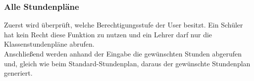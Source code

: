 \subsubsection{Alle Stundenpläne}
Zuerst wird überprüft, welche Berechtigungsstufe der User besitzt. Ein Schüler hat kein Recht diese Funktion zu nutzen und ein Lehrer darf nur die Klassenstundenpläne abrufen.\\
Anschließend werden anhand der Eingabe die gewünschten Stunden abgerufen und, gleich wie beim Standard-Stundenplan, daraus der gewünschte Stundenplan generiert.